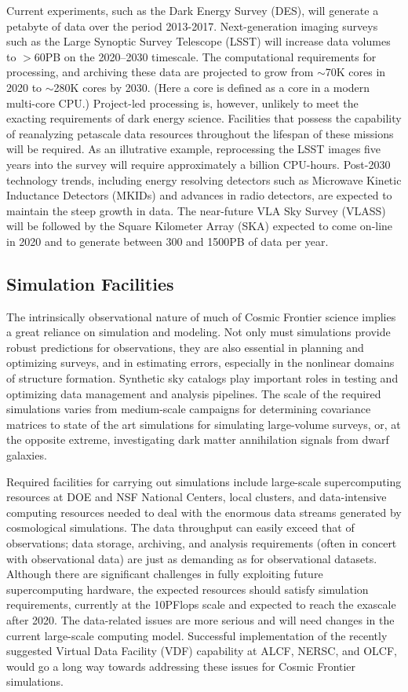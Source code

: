 Current experiments, such as the Dark Energy Survey (DES), will
generate a petabyte of data over the period 2013-2017. Next-generation
imaging surveys such as the Large Synoptic Survey Telescope (LSST)
will increase data volumes to $> 60$PB on the 2020--2030
timescale. The computational requirements for processing, and
archiving these data are projected to grow from $\sim$70K cores in
2020 to $\sim$280K cores by 2030. (Here a core is defined as a core in
a modern multi-core CPU.) Project-led processing is, however, unlikely
to meet the exacting requirements of dark energy science. Facilities
that possess the capability of reanalyzing petascale data resources
throughout the lifespan of these missions will be required. As an
illutrative example, reprocessing the LSST images five years into the
survey will require approximately a billion CPU-hours. Post-2030
technology trends, including energy resolving detectors such as
Microwave Kinetic Inductance Detectors (MKIDs) and advances in radio
detectors, are expected to maintain the steep growth in data. The
near-future VLA Sky Survey (VLASS) will be followed by the Square
Kilometer Array (SKA) expected to come on-line in 2020 and to generate
between 300 and 1500PB of data per year.

\subsection{Simulation Facilities}

The intrinsically observational nature of much of Cosmic Frontier
science implies a great reliance on simulation and modeling. Not only
must simulations provide robust predictions for observations, they are
also essential in planning and optimizing surveys, and in estimating
errors, especially in the nonlinear domains of structure
formation. Synthetic sky catalogs play important roles in testing and
optimizing data management and analysis pipelines. The scale of the
required simulations varies from medium-scale campaigns for
determining covariance matrices to state of the art simulations for
simulating large-volume surveys, or, at the opposite extreme,
investigating dark matter annihilation signals from dwarf galaxies.

Required facilities for carrying out simulations include large-scale
supercomputing resources at DOE and NSF National Centers, local
clusters, and data-intensive computing resources needed to deal with
the enormous data streams generated by cosmological simulations. The
data throughput can easily exceed that of observations; data storage,
archiving, and analysis requirements (often in concert with
observational data) are just as demanding as for observational
datasets. Although there are significant challenges in fully
exploiting future supercomputing hardware, the expected resources
should satisfy simulation requirements, currently at the 10PFlops
scale and expected to reach the exascale after 2020. The data-related
issues are more serious and will need changes in the current
large-scale computing model. Successful implementation of the recently
suggested Virtual Data Facility (VDF) capability at ALCF, NERSC, and
OLCF, would go a long way towards addressing these issues for Cosmic
Frontier simulations.

